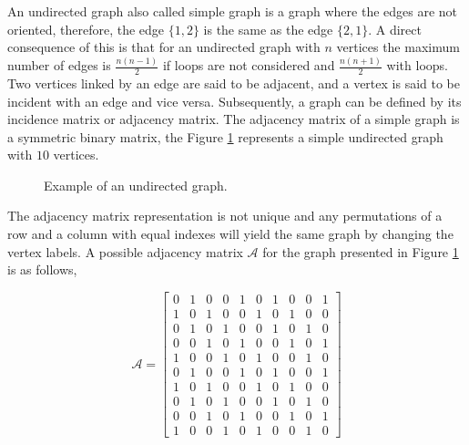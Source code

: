 An undirected graph also called simple graph is a graph where the edges are not oriented, therefore, the edge $\{1,2\}$ is the same as the edge $\{2,1\}$. A direct consequence of this is that for an undirected graph with $n$ vertices the maximum number of edges is $\frac{n(n-1)}{2}$ if loops are not considered and $\frac{n(n+1)}{2}$ with loops. Two vertices linked by an edge are said to be adjacent, and a vertex is said to be incident with an edge and vice versa. Subsequently, a graph can be defined by its incidence matrix or adjacency matrix. The adjacency matrix of a simple graph is a symmetric binary matrix, the Figure \ref{figB.1} represents a simple undirected graph with $10$ vertices.

\begin{figure}[!htbp]
\centering
{}
\caption{Example of an undirected graph.}
\label{figB.1}
\end{figure}

The adjacency matrix representation is not unique and any permutations of a row and a column with equal indexes will yield the same graph by changing the vertex labels. A possible adjacency matrix $\mathcal{A}$ for the graph presented in Figure \ref{figB.1} is as follows,

\begin{equation} \label{eqnB.2}
\mathcal{A}=
\begin{bmatrix}
0 & 1 & 0 & 0 & 1 & 0 & 1 & 0 & 0 & 1 \\
1 & 0 & 1 & 0 & 0 & 1 & 0 & 1 & 0 & 0 \\
0 & 1 & 0 & 1 & 0 & 0 & 1 & 0 & 1 & 0 \\
0 & 0 & 1 & 0 & 1 & 0 & 0 & 1 & 0 & 1 \\
1 & 0 & 0 & 1 & 0 & 1 & 0 & 0 & 1 & 0 \\
0 & 1 & 0 & 0 & 1 & 0 & 1 & 0 & 0 & 1 \\
1 & 0 & 1 & 0 & 0 & 1 & 0 & 1 & 0 & 0 \\
0 & 1 & 0 & 1 & 0 & 0 & 1 & 0 & 1 & 0 \\
0 & 0 & 1 & 0 & 1 & 0 & 0 & 1 & 0 & 1 \\
1 & 0 & 0 & 1 & 0 & 1 & 0 & 0 & 1 & 0
\end{bmatrix}
\end{equation}

